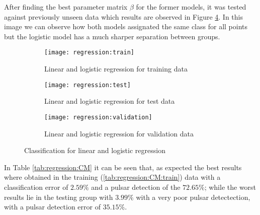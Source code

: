 \documentclass[journal]{IEEEtran}
\begin{document}
After finding the best parameter matrix $\beta$ for the former models, it was
tested against previously unseen data which results are observed in Figure
\ref{fig:regression}. In this image we can observe how both models assignated
the same class for all points but the logistic model has a much sharper
separation between groups. 

\begin{figure}[ht]
    \begin{subfigure}[b]{\linewidth}
        \texttt{[image: regression:train]}
        \caption{Linear and logistic regression for training data
        \label{fig:regression:train}}
    \end{subfigure}
    \begin{subfigure}[b]{\linewidth}
        \texttt{[image: regression:test]}
        \caption{Linear and logistic regression for test data
        \label{fig:regression:test}}
    \end{subfigure}
    \begin{subfigure}[b]{\linewidth}
        \texttt{[image: regression:validation]}
        \caption{Linear and logistic regression for validation data
        \label{fig:regression:validation}}
    \end{subfigure}
    \caption{Classification for linear and logistic regression
        \label{fig:regression}}
\end{figure}

In Table \ref{tab:regression:CM} it can be seen that, as expected the best
results where obtained in the training (\ref{tab:regression:CM:train}) data with
a classification error of $2.59\%$ and a pulsar detection of the $72.65\%$;
while the worst results lie in the testing group with $3.99\%$ with a very poor
pulsar detectection, with a pulsar detection error of $35.15\%$.
\end{document}
